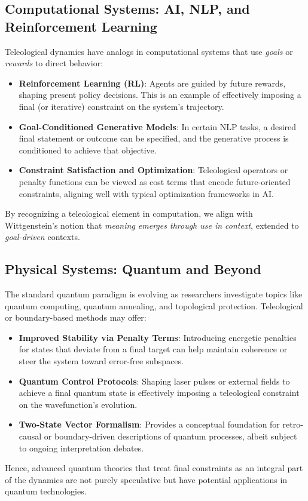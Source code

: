 \documentclass[11pt]{article}
\begin{document}
\subsection{Computational Systems: AI, NLP, and Reinforcement Learning}
Teleological dynamics have analogs in computational systems that use \emph{goals} or \emph{rewards} to direct behavior:
\begin{itemize}
    \item \textbf{Reinforcement Learning (RL)}: Agents are guided by future rewards, shaping present policy decisions. This is an example of effectively imposing a final (or iterative) constraint on the system’s trajectory.
    \item \textbf{Goal-Conditioned Generative Models}: In certain NLP tasks, a desired final statement or outcome can be specified, and the generative process is conditioned to achieve that objective.
    \item \textbf{Constraint Satisfaction and Optimization}: Teleological operators or penalty functions can be viewed as cost terms that encode future-oriented constraints, aligning well with typical optimization frameworks in AI.
\end{itemize}
By recognizing a teleological element in computation, we align with Wittgenstein’s notion that \emph{meaning emerges through use in context}, extended to \emph{goal-driven} contexts.

\subsection{Physical Systems: Quantum and Beyond}
The standard quantum paradigm is evolving as researchers investigate topics like quantum computing, quantum annealing, and topological protection. Teleological or boundary-based methods may offer:
\begin{itemize}
    \item \textbf{Improved Stability via Penalty Terms}: Introducing energetic penalties for states that deviate from a final target can help maintain coherence or steer the system toward error-free subspaces.
    \item \textbf{Quantum Control Protocols}: Shaping laser pulses or external fields to achieve a final quantum state is effectively imposing a teleological constraint on the wavefunction's evolution.
    \item \textbf{Two-State Vector Formalism}: Provides a conceptual foundation for retro-causal or boundary-driven descriptions of quantum processes, albeit subject to ongoing interpretation debates.
\end{itemize}
Hence, advanced quantum theories that treat final constraints as an integral part of the dynamics are not purely speculative but have potential applications in quantum technologies.
\end{document}
